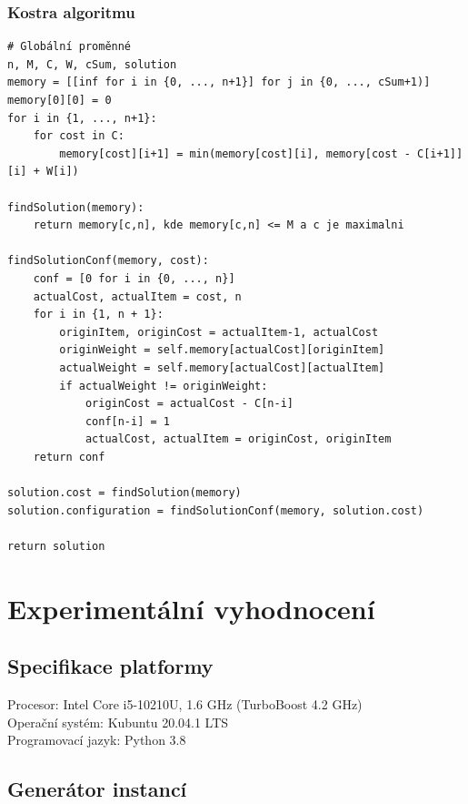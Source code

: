\documentclass[12pt]{article}
\begin{document}
\subsubsection{Kostra algoritmu}

\begin{listing}[ht]
    \begin{verbatim}
# Globální proměnné
n, M, C, W, cSum, solution
memory = [[inf for i in {0, ..., n+1}] for j in {0, ..., cSum+1)]
memory[0][0] = 0
for i in {1, ..., n+1}:
    for cost in C:
        memory[cost][i+1] = min(memory[cost][i], memory[cost - C[i+1]][i] + W[i])

findSolution(memory):
    return memory[c,n], kde memory[c,n] <= M a c je maximalni

findSolutionConf(memory, cost):
    conf = [0 for i in {0, ..., n}]
    actualCost, actualItem = cost, n
    for i in {1, n + 1}:
        originItem, originCost = actualItem-1, actualCost
        originWeight = self.memory[actualCost][originItem]
        actualWeight = self.memory[actualCost][actualItem]
        if actualWeight != originWeight:
            originCost = actualCost - C[n-i]
            conf[n-i] = 1
            actualCost, actualItem = originCost, originItem
    return conf

solution.cost = findSolution(memory)
solution.configuration = findSolutionConf(memory, solution.cost)

return solution

    \end{verbatim}
\end{listing}

\newpage

\section{Experimentální vyhodnocení}

\subsection{Specifikace platformy}

Procesor: Intel Core i5-10210U, 1.6 GHz (TurboBoost 4.2 GHz) \\
Operační systém: Kubuntu 20.04.1 LTS \\
Programovací jazyk: Python 3.8

\subsection{Generátor instancí}
\end{document}
